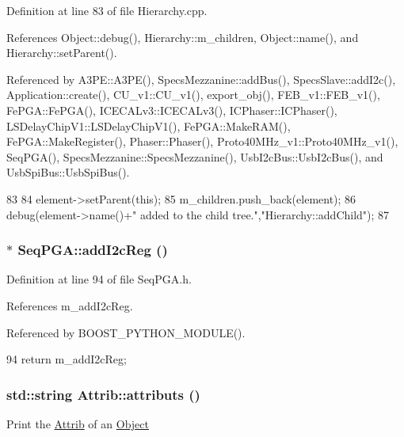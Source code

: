 Definition at line 83 of file Hierarchy.cpp.

References Object::debug(), Hierarchy::m\_\-children, Object::name(), and Hierarchy::setParent().

Referenced by A3PE::A3PE(), SpecsMezzanine::addBus(), SpecsSlave::addI2c(), Application::create(), CU\_\-v1::CU\_\-v1(), export\_\-obj(), FEB\_\-v1::FEB\_\-v1(), FePGA::FePGA(), ICECALv3::ICECALv3(), ICPhaser::ICPhaser(), LSDelayChipV1::LSDelayChipV1(), FePGA::MakeRAM(), FePGA::MakeRegister(), Phaser::Phaser(), Proto40MHz\_\-v1::Proto40MHz\_\-v1(), SeqPGA(), SpecsMezzanine::SpecsMezzanine(), UsbI2cBus::UsbI2cBus(), and UsbSpiBus::UsbSpiBus().


\begin{DoxyCode}
83                                           {
84   element->setParent(this);
85   m_children.push_back(element);
86   debug(element->name()+" added to the child tree.","Hierarchy::addChild");
87 }
\end{DoxyCode}
\hypertarget{classSeqPGA_a80eec67d433c12f8fcdf1ad73c6b8f59}{
\subsubsection[{addI2cReg}]{$\ast$ SeqPGA::addI2cReg ()}}
\label{classSeqPGA_a80eec67d433c12f8fcdf1ad73c6b8f59}


Definition at line 94 of file SeqPGA.h.

References m\_\-addI2cReg.

Referenced by BOOST\_\-PYTHON\_\-MODULE().


\begin{DoxyCode}
94 { return m_addI2cReg;    }
\end{DoxyCode}
\hypertarget{classAttrib_aee7bbf16b144887f196e1341b24f8a26}{
\subsubsection[{attributs}]{\setlength{\rightskip}{0pt plus 5cm}std::string Attrib::attributs ()}}
\label{classAttrib_aee7bbf16b144887f196e1341b24f8a26}
Print the \hyperlink{classAttrib}{Attrib} of an \hyperlink{classObject}{Object} 

